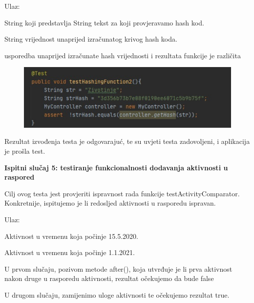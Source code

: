 		Ulaz:
		\noindent
		\begin{packed_enum}
		    \item String koji predstavlja String tekst za koji provjeravamo hash kod.
		    \item String vrijednost unaprijed izračunatog krivog hash koda.
		\end{packed_enum}
		
		\noindent
		\begin{packed_enum}
		    \item usporedba unaprijed izračunate hash vrijednosti i rezultata funkcije je različita

		\end{packed_enum}
		
		\begin{figure}[H]
            \includegraphics[scale=1]{dokumentacija/slike/testHash2.PNG} %
            \centering
            \label{fig:promjene}
            \end{figure}
			
		Rezultat izvođenja testa je odgovarajuć, te su uvjeti testa zadovoljeni, i aplikacija je prošla test.
		
        
        \pagebreak
        
		\textbf{Ispitni slučaj 5: testiranje funkcionalnosti dodavanja aktivnosti u raspored}
			
		Cilj ovog testa jest provjeriti ispravnost rada funkcije testActivityComparator. Konkretnije, ispitujemo je li redosljed aktivnosti u rasporedu ispravan.
		
		\vspace{3mm} %
		Ulaz:
		\noindent
		\begin{packed_enum}
		    \item Aktivnost u vremenu koja počinje 15.5.2020.
		    \item Aktivnost u vremenu koja počinje 1.1.2021.
		\end{packed_enum}
		
		\noindent
		\begin{packed_enum}
		    \item U prvom slučaju, pozivom metode after(), koja utvrđuje je li prva aktivnost nakon druge u rasporedu aktivnosti, rezultat očekujemo da bude false
		    
		    \item U drugom slučaju, zamijenimo uloge aktivnosti te očekujemo rezultat true.

		\end{packed_enum}
		
